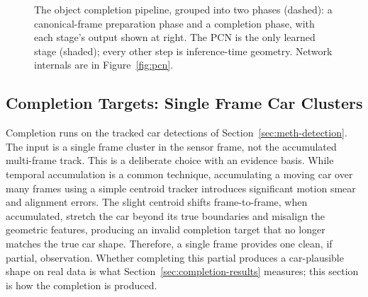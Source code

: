 \documentclass[a4paper,12pt]{report}
\begin{document}
\begin{figure}[H]
  \caption[Object completion pipeline]{The object completion pipeline, grouped into two
    phases (dashed): a canonical-frame preparation phase and a completion phase, with each
    stage's output shown at right. The PCN is the only learned stage (shaded); every other
    step is inference-time geometry. Network internals are in Figure~\ref{fig:pcn}.}
  \label{fig:completion-pipeline}
\end{figure}

\subsection{Completion Targets: Single Frame Car Clusters}
\label{sec:completion-what}

Completion runs on the tracked car detections of Section~\ref{sec:meth-detection}. The input is a
single frame cluster in the sensor frame, not the accumulated multi-frame
track. This is a deliberate choice with an evidence basis. While temporal accumulation is a common
technique, accumulating a moving car over many frames using a simple centroid tracker
introduces significant motion smear and alignment errors. The slight centroid shifts
frame-to-frame, when accumulated, stretch the car beyond its true boundaries and misalign
the geometric features, producing an invalid completion target that no longer matches the
true car shape. Therefore, a single frame provides one clean, if partial,
observation. Whether completing this partial produces a car-plausible shape on real data
is what Section~\ref{sec:completion-results} measures; this section is how the completion
is produced.
\end{document}
